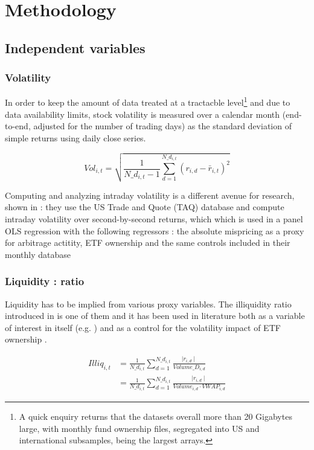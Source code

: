 \section{Methodology}
\subsection{Independent variables}
\subsubsection{Volatility}
In order to keep the amount of data treated at a tractacble level\footnote{A quick enquiry returns that the datasets overall more than 20 Gigabytes large, with monthly fund ownership files, segregated into US and international subsamples, being the largest arrays.} and due to data availability limits, stock volatility is measured over a calendar month (end-to-end, adjusted for the number of trading days) as the standard deviation of simple returns using daily close series.

\begin{equation}
  Vol_{i, t} = \sqrt{\frac{1}{N\_d_{i, t} - 1} \sum_{d = 1}^{N\_d_{i, t}} (r_{i, d} - \bar{r}_{i, t})^2}
  \end{equation}

Computing and analyzing intraday volatility is a different avenue for research, shown in \cite{Ben-David2018} : they use the US Trade and Quote (TAQ) database and compute intraday volatility over second-by-second returns, which which is used in a panel OLS regression with the following regressors : the absolute mispricing as a proxy for arbitrage actitity, ETF ownership and the same controls included in their monthly database
\subsubsection{Liquidity : \cite{Amihud2002} ratio}
Liquidity has to be implied from various proxy variables. The illiquidity ratio introduced in \cite{Amihud2002} is one of them and it has been used in literature both as a variable of interest in itself (e.g. \cite{Israeli2017}) and as a control for the volatility impact of ETF ownership \parencite{Ben-David2018}.

\begin{equation}
  \begin{split}
    Illiq_{i, t} & = \frac{1}{N\_d_{i, t}} \sum_{d = 1}^{N\_d_{i, t}} \frac{\mid r_{i, d} \mid}{Volume\_D_{i, d}}\\
    &  = \frac{1}{N\_d_{i, t}} \sum_{d = 1}^{N\_d_{i, t}} \frac{\mid r_{i, d} \mid}{Volume_{i, d} \cdot VWAP_{i, d}}
    \end{split}
\end{equation}

